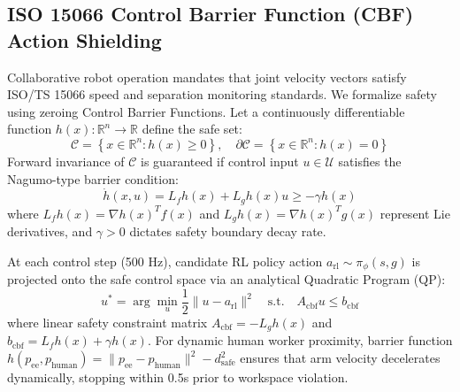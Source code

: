 \documentclass[10pt,twocolumn,a4paper]{article}
\newcommand{\R}{\mathbb{R}}
\begin{document}
\subsection{ISO 15066 Control Barrier Function (CBF) Action Shielding}
Collaborative robot operation mandates that joint velocity vectors satisfy ISO/TS 15066 speed and separation monitoring standards. We formalize safety using zeroing Control Barrier Functions. Let a continuously differentiable function $h(x): \R^n \to \R$ define the safe set:
\begin{equation}
  \mathcal{C} = \left\{ x \in \R^n : h(x) \ge 0 \right\}, \quad \partial\mathcal{C} = \left\{ x \in \R^n : h(x) = 0 \right\}
  \label{eq:safe_set}
\end{equation}
Forward invariance of $\mathcal{C}$ is guaranteed if control input $u \in \mathcal{U}$ satisfies the Nagumo-type barrier condition:
\begin{equation}
  \dot{h}(x, u) = L_f h(x) + L_g h(x)u \ge -\gamma h(x)
  \label{eq:cbf_condition}
\end{equation}
where $L_f h(x) = \nabla h(x)^T f(x)$ and $L_g h(x) = \nabla h(x)^T g(x)$ represent Lie derivatives, and $\gamma > 0$ dictates safety boundary decay rate.

At each control step (500 Hz), candidate RL policy action $a_{\text{rl}} \sim \pi_\phi(s, g)$ is projected onto the safe control space via an analytical Quadratic Program (QP):
\begin{equation}
  u^* = \arg\min_{u} \frac{1}{2} \|u - a_{\text{rl}}\|^2 \quad \text{s.t.} \quad A_{\text{cbf}} u \le b_{\text{cbf}}
  \label{eq:qp_filter}
\end{equation}
where linear safety constraint matrix $A_{\text{cbf}} = -L_g h(x)$ and $b_{\text{cbf}} = L_f h(x) + \gamma h(x)$. For dynamic human worker proximity, barrier function $h(p_{\text{ee}}, p_{\text{human}}) = \|p_{\text{ee}} - p_{\text{human}}\|^2 - d_{\text{safe}}^2$ ensures that arm velocity decelerates dynamically, stopping within 0.5s prior to workspace violation.
\end{document}
